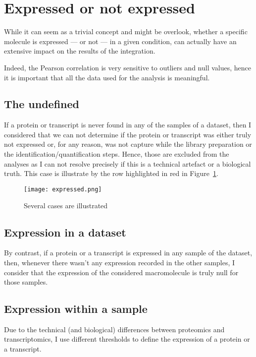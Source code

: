 \section{Expressed or not expressed}
\label{sec:IntegrationExpressedOrNot}

While it can seem as a trivial concept and might be overlook, whether a specific
molecule is expressed --- or not --- in a given condition, can actually have
an extensive impact on the results of the integration.

Indeed, the Pearson correlation is very sensitive to outliers and null values,
hence it is important that all the data used for the analysis is meaningful.


\subsection{The undefined}
\label{sec:IntegrationExpressedOrNot-undefined}
If a protein or transcript is never found in any of the samples of a dataset,
then I considered that we can not determine if the protein or transcript was
either truly not expressed or, for any reason, was not capture while the library
preparation or the identification/quantification steps. Hence, those are
excluded from the analyses as I can not resolve precisely if this is a
technical artefact or a biological truth. This case is illustrate by the row
highlighted in red in Figure~\ref{DefineExpression}.

\begin{figure}%
\texttt{[image: expressed.png]}\centering
    \caption{\label{DefineExpression}Several cases are illustrated}
\end{figure}

\subsection{Expression in a dataset}
\label{sec:IntegrationExpressedOrNot--expDataset}
By contrast, if a protein or a transcript is expressed in any sample of the
dataset, then, whenever there wasn't any expression recorded in the other
samples, I consider that the expression of the considered macromolecule is truly
null for those samples.

\subsection{Expression within a sample}
Due to the technical (and biological) differences between proteomics and
transcriptomics, I use different thresholds to define the expression of a protein
or a transcript.


